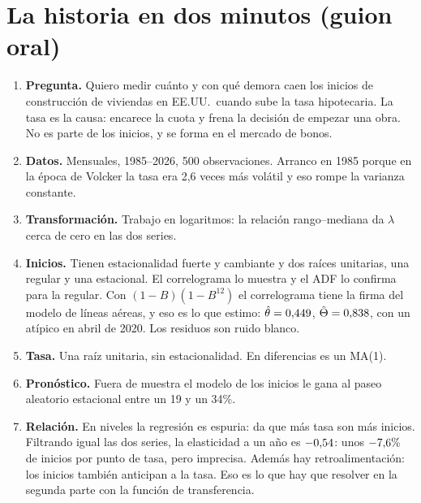 \documentclass[11pt,a4paper]{article}
\begin{document}
\section{La historia en dos minutos (guion oral)}
\begin{enumerate}[leftmargin=1.4em]
\item \textbf{Pregunta.} Quiero medir cu\'anto y con qu\'e demora caen los inicios de construcci\'on de viviendas en EE.UU.\ cuando sube la tasa hipotecaria. La tasa es la causa: encarece la cuota y frena la decisi\'on de empezar una obra. No es parte de los inicios, y se forma en el mercado de bonos.
\item \textbf{Datos.} Mensuales, 1985--2026, 500 observaciones. Arranco en 1985 porque en la \'epoca de Volcker la tasa era 2,6 veces m\'as vol\'atil y eso rompe la varianza constante.
\item \textbf{Transformaci\'on.} Trabajo en logaritmos: la relaci\'on rango--mediana da $\lambda$ cerca de cero en las dos series.
\item \textbf{Inicios.} Tienen estacionalidad fuerte y cambiante y dos ra\'ices unitarias, una regular y una estacional. El correlograma lo muestra y el ADF lo confirma para la regular. Con $(1-B)(1-B^{12})$ el correlograma tiene la firma del modelo de l\'ineas a\'ereas, y eso es lo que estimo: $\hat\theta=0{,}449$, $\hat\Theta=0{,}838$, con un at\'ipico en abril de 2020. Los residuos son ruido blanco.
\item \textbf{Tasa.} Una ra\'iz unitaria, sin estacionalidad. En diferencias es un MA(1).
\item \textbf{Pron\'ostico.} Fuera de muestra el modelo de los inicios le gana al paseo aleatorio estacional entre un 19 y un 34\%.
\item \textbf{Relaci\'on.} En niveles la regresi\'on es espuria: da que m\'as tasa son m\'as inicios. Filtrando igual las dos series, la elasticidad a un a\~no es $-0{,}54$: unos $-7{,}6\%$ de inicios por punto de tasa, pero imprecisa. Adem\'as hay retroalimentaci\'on: los inicios tambi\'en anticipan a la tasa. Eso es lo que hay que resolver en la segunda parte con la funci\'on de transferencia.
\end{enumerate}

\end{document}
